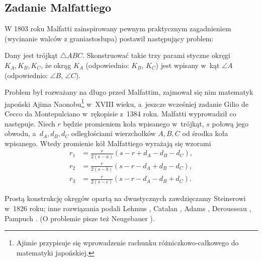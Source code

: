%

\subsection{Zadanie Malfattiego}
W 1803 roku Malfatti \cite{malfatti_1803} zainspirowany pewnym praktycznym zagadnieniem (wycinanie walców z graniastosłupa) postawił następujący problem:
%

\begin{problem}
%
	Dany jest trójkąt $\triangle ABC$.
	Skonstruować takie trzy parami styczne okręgi $K_A, K_B, K_C$, że okrąg $K_A$ (odpowiednio: $K_B$, $K_C$) jest wpisany w~kąt $\angle A$ (odpowiednio: $\angle B$, $\angle C$).
\end{problem}

Problem był rozważany na długo przed Malfattim, zajmował się nim matematyk japoński Ajima Naonobu\footnote{Ajimie przypisuje się wprowadzenie rachunku różniczkowo-całkowego do matematyki japońskiej.} w~XVIII wieku, a~jeszcze wcześniej zadanie Gilio de Cecco da Montepulciano w~rękopisie z~1384 roku.
%
%
Malfatti wyprowadził co następuje.
Niech $r$ będzie promieniem koła wpisanego w~trójkąt, $s$ połową jego obwodu, a~$d_A, d_B, d_C$ odległościami wierzchołków $A, B, C$ od środka koła wpisanego.
Wtedy promienie kół Malfattiego wyrażają się wzorami
\begin{align}
	r_1 & = {\frac {r}{2(s-a)}}(s-r+d_A-d_B-d_C), \\
	r_2 & = {\frac {r}{2(s-b)}}(s-r-d_A+d_B-d_C), \\
	r_3 & = {\frac {r}{2(s-c)}}(s-r-d_A-d_B+d_C).
\end{align}

Prostą konstrukcję okręgów opartą na dwustycznych zawdzięczamy Steinerowi \cite{steiner_1826} w~1826 roku;
%
inne rozwiązania podali Lehmus \cite{lehmus_1819}, Catalan \cite{catalan_1846}, Adams \cite{adams_1846}, Derousseau \cite{derousseau_1895}, Pampuch \cite{pampuch_1904}.
(O problemie pisze też Neugebauer \cite[s. 102]{neugebauer_2018}).

